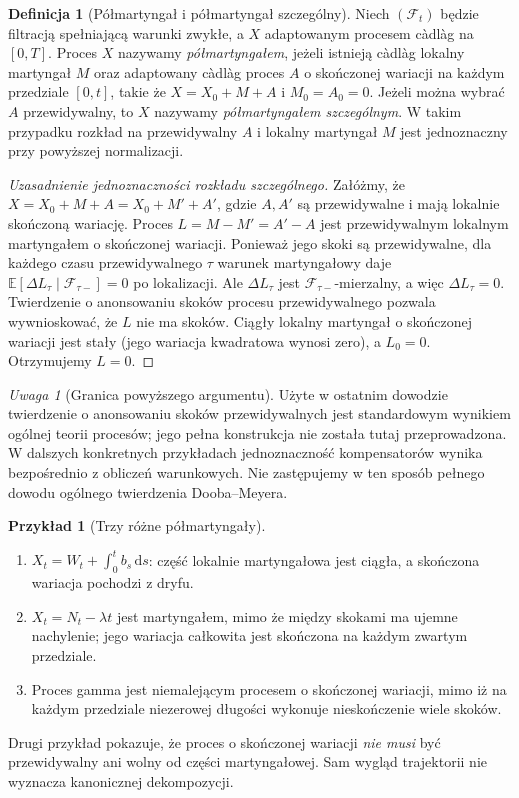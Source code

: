 \documentclass[11pt,a4paper,oneside]{report}
\numberwithin{equation}{chapter}
\theoremstyle{plain}
\theoremstyle{definition}
\newtheorem{definicja}{Definicja}[chapter]
\newtheorem{przyklad}{Przykład}[chapter]
\theoremstyle{remark}
\newtheorem{uwaga}{Uwaga}[chapter]
\newcommand{\E}{\mathbb{E}}
\newcommand{\calF}{\mathcal{F}}
\newcommand{\dd}{\mathrm{d}}
\begin{document}
\begin{definicja}[Półmartyngał i półmartyngał szczególny]
\label{def:semimartingale}
Niech $(\calF_t)$ będzie filtracją spełniającą warunki zwykłe,
a $X$ adaptowanym procesem càdlàg na $[0,T]$.
Proces $X$ nazywamy \emph{półmartyngałem}, jeżeli istnieją
càdlàg lokalny martyngał $M$ oraz adaptowany càdlàg proces
$A$ o skończonej wariacji na każdym przedziale $[0,t]$,
takie że $X=X_0+M+A$ i $M_0=A_0=0$.
Jeżeli można wybrać $A$ przewidywalny, to $X$ nazywamy
\emph{półmartyngałem szczególnym}. W takim przypadku
rozkład na przewidywalny $A$ i lokalny martyngał $M$
jest jednoznaczny przy powyższej normalizacji.
\end{definicja}

\begin{proof}[Uzasadnienie jednoznaczności rozkładu szczególnego]
Załóżmy, że $X=X_0+M+A=X_0+M'+A'$, gdzie $A,A'$ są
przewidywalne i mają lokalnie skończoną wariację.
Proces $L=M-M'=A'-A$ jest przewidywalnym lokalnym
martyngałem o skończonej wariacji. Ponieważ jego skoki są
przewidywalne, dla każdego czasu przewidywalnego $\tau$
warunek martyngałowy daje
$\E[\Delta L_\tau\mid\calF_{\tau-}]=0$ po lokalizacji.
Ale $\Delta L_\tau$ jest $\calF_{\tau-}$-mierzalny,
a więc $\Delta L_\tau=0$. Twierdzenie o anonsowaniu
skoków procesu przewidywalnego pozwala wywnioskować,
że $L$ nie ma skoków. Ciągły lokalny martyngał o
skończonej wariacji jest stały (jego wariacja kwadratowa
wynosi zero), a $L_0=0$. Otrzymujemy $L=0$.
\end{proof}

\begin{uwaga}[Granica powyższego argumentu]
Użyte w ostatnim dowodzie twierdzenie o anonsowaniu skoków
przewidywalnych jest standardowym wynikiem ogólnej teorii
procesów; jego pełna konstrukcja nie została tutaj
przeprowadzona. W dalszych konkretnych przykładach
jednoznaczność kompensatorów wynika bezpośrednio z
obliczeń warunkowych. Nie zastępujemy w ten sposób
pełnego dowodu ogólnego twierdzenia Dooba--Meyera.
\end{uwaga}

\begin{przyklad}[Trzy różne półmartyngały]
\begin{enumerate}
\item $X_t=W_t+\int_0^tb_s\,\dd s$: część
lokalnie martyngałowa jest ciągła, a skończona wariacja
pochodzi z dryfu.
\item $X_t=N_t-\lambda t$ jest martyngałem, mimo że
między skokami ma ujemne nachylenie; jego wariacja
całkowita jest skończona na każdym zwartym przedziale.
\item Proces gamma jest niemalejącym procesem o
skończonej wariacji, mimo iż na każdym przedziale
niezerowej długości wykonuje nieskończenie wiele skoków.
\end{enumerate}
Drugi przykład pokazuje, że proces o skończonej wariacji
\emph{nie musi} być przewidywalny ani wolny od części
martyngałowej. Sam wygląd trajektorii nie wyznacza
kanonicznej dekompozycji.
\end{przyklad}
\end{document}
